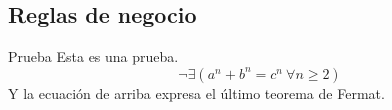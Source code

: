 %
%

\subsection{Reglas de negocio}

{Prueba}
{
  Esta es una prueba.
  $$ \lnot \exists (a^n + b^n = c^n \ \forall n \geq 2) $$
  Y la ecuación de arriba expresa el último teorema de Fermat.
}


